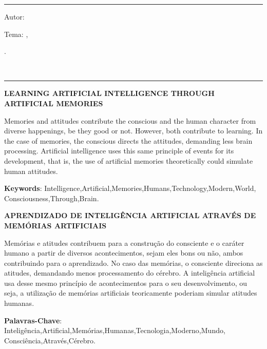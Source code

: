 

\hrule	%
\begin{center} %
\begin{minipage}[c]{12.5cm} %
Autor: \imprimirautor

Tema: \imprimirtitulo 
\imprimirlocal, 
\imprimirorientador\\
\hspace{0.5cm}
\parbox[t]{\textwidth}{\imprimirinstituicao
\imprimirdata.}\\
\hspace{0.5cm}
\end{minipage}
\end{center}
\hrule

\vspace{1cm}

\SingleSpacing
\noindent
{\textbf{LEARNING ARTIFICIAL INTELLIGENCE THROUGH ARTIFICIAL MEMORIES}}
\indent
\small

Memories and attitudes contribute the conscious and the human character from diverse happenings, be they good or not. However, both contribute to learning. In the case of memories, the conscious directs the attitudes, demanding less brain processing. Artificial intelligence uses this same principle of events for its development, that is, the use of artificial memories theoretically could simulate human attitudes.

\noindent
 
\textbf{Keywords}: Intelligence,Artificial,Memories,Humans,Technology,Modern,World,
\\Consciousness,Through,Brain.

\SingleSpacing
\noindent
{\textbf{APRENDIZADO DE INTELIGÊNCIA ARTIFICIAL ATRAVÉS DE MEMÓRIAS ARTIFICIAIS}}
\indent
\small

Memórias e atitudes contribuem para a construção do consciente e o caráter humano a partir de diversos acontecimentos, sejam eles bons ou não, ambos contribuindo para o aprendizado. No caso das memórias, o consciente direciona as atitudes, demandando menos processamento do cérebro. A inteligência artificial usa desse mesmo princípio de acontecimentos para o seu desenvolvimento, ou seja, a utilização de memórias artificiais teoricamente poderiam simular atitudes humanas.

\noindent
 
\textbf{Palavras-Chave}: Inteligência,Artificial,Memórias,Humanas,Tecnologia,Moderno,Mundo,
\\Consciência,Através,Cérebro.

